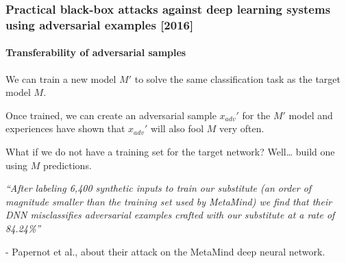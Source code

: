 \documentclass[9pt]{beamer}
\begin{document}
\begin{frame}
  \frametitle{{\small Practical black-box attacks against deep learning
    systems using adversarial examples [2016]}}

  \framesubtitle{Transferability of adversarial samples}


  We can train a new model $M'$ to solve the same classification task
  as the target model $M$.

  \pause

  \bigskip

  Once trained, we can create an adversarial sample $x_{adv}'$ for the
  $M'$ model and experiences have shown that $x_{adv}'$ will also fool
  $M$ very often.

  \pause

  \bigskip

  What if we do not have a training set for the target network?
  Well\dots{} build one using $M$ predictions.

  \pause

  \bigskip

  \textit{``After labeling 6,400 synthetic inputs to train our
    substitute (an order of magnitude smaller than the training set
    used by MetaMind) we find that their DNN misclassifies adversarial
    examples crafted with our substitute at a rate of 84.24\%''}

  \medskip

  - Papernot et al., about their attack on the MetaMind deep neural
  network.

\end{frame}
\end{document}

